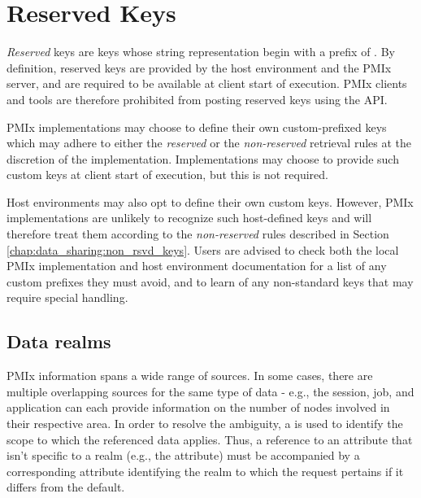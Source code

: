 \chapter{Reserved Keys}
\label{chap:api_rsvd_keys}


\emph{Reserved} keys are keys whose string representation begin with a prefix of
. By definition, reserved keys are provided by the host
environment and the \ac{PMIx} server, and are required to be available at client
start of execution. \ac{PMIx} clients and tools are therefore prohibited from
posting reserved keys using the  \ac{API}.

\ac{PMIx} implementations may choose to define their own
custom-prefixed keys which may adhere to either the \emph{reserved} or the \emph{non-reserved} retrieval rules at the discretion of the implementation. Implementations may choose to provide such custom keys at client start of execution, but this is not required.

Host environments may also opt to define their own custom keys. However, \ac{PMIx} implementations are unlikely to recognize such host-defined keys and will therefore treat them according to the \emph{non-reserved} rules described in Section \ref{chap:data_sharing:non_rsvd_keys}. Users
are advised to check both the local \ac{PMIx} implementation and host environment documentation
for a list of any custom prefixes they must avoid, and to learn of any non-standard keys that may require special handling.


\section{Data realms}
\label{api:struct:attributes:retrieval}

\ac{PMIx} information spans a wide range of sources. In some cases,
there are multiple overlapping sources for the same type of data - e.g., the
session, job, and application can each provide information on the number of
nodes involved in their respective area. In order to resolve the ambiguity,
a 
is used to identify the scope to which the referenced data applies. Thus, a reference
to an attribute that isn't specific to a realm (e.g., the
 attribute) must be accompanied by a corresponding
attribute identifying the realm to which the request pertains if it differs
from the default.

